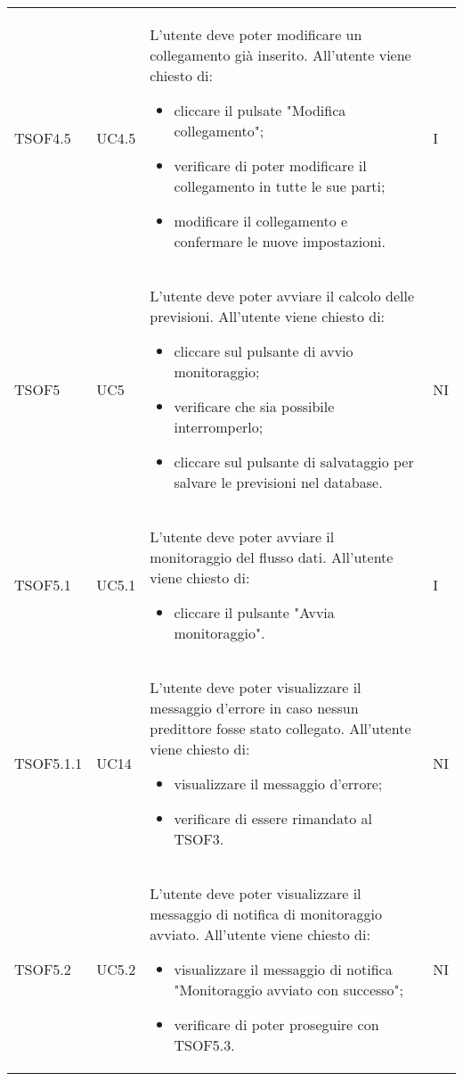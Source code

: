 \begin{longtable}{C{2.5cm} C{2.5cm} L{8cm} C{2cm}}
TSOF4.5 &
UC4.5 &
L'utente deve poter modificare un collegamento già inserito. All'utente viene chiesto di:
\begin{itemize}
	\item cliccare il pulsate "Modifica collegamento";
	\item verificare di poter modificare il collegamento in tutte le sue parti;
	\item modificare il collegamento e confermare le nuove impostazioni.
\end{itemize}&
I \\




TSOF5 &
UC5 &
L'utente deve poter avviare il calcolo delle previsioni. All'utente viene chiesto di:
\begin{itemize}
	\item cliccare sul pulsante di avvio monitoraggio;
	\item verificare che sia possibile interromperlo;
	\item cliccare sul pulsante di salvataggio per salvare le previsioni nel database.
\end{itemize}&
NI \\

TSOF5.1 &
UC5.1 &
L'utente deve poter avviare il monitoraggio del flusso dati. All'utente viene chiesto di:
\begin{itemize}
	\item cliccare il pulsante "Avvia monitoraggio".
\end{itemize}&
I \\

TSOF5.1.1 &
UC14 &
L'utente deve poter visualizzare il messaggio d'errore in caso nessun predittore fosse stato collegato. All'utente viene chiesto di:
\begin{itemize}
	\item visualizzare il messaggio d'errore;
	\item verificare di essere rimandato al TSOF3.
\end{itemize}&
NI \\

TSOF5.2 &
UC5.2 &
L'utente deve poter visualizzare il messaggio di notifica di monitoraggio avviato. All'utente viene chiesto di:
\begin{itemize}
	\item visualizzare il messaggio di notifica "Monitoraggio avviato con successo";
	\item verificare di poter proseguire con TSOF5.3.
\end{itemize}&
NI \\


\end{longtable}
